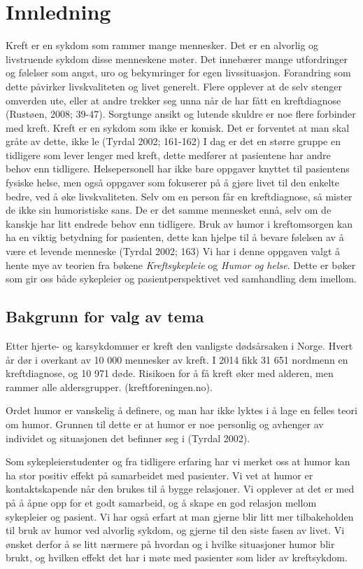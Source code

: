 \chapter{Innledning}

Kreft er en sykdom som rammer mange mennesker. Det er en alvorlig og
livstruende sykdom disse menneskene møter. Det innebærer mange utfordringer og
følelser som angst, uro og bekymringer for egen livssituasjon. Forandring som
dette påvirker livskvaliteten og livet generelt. Flere opplever at de selv
stenger omverden ute, eller at andre trekker seg unna når de har fått en
kreftdiagnose (Rustøen, 2008; 39-47). Sorgtunge ansikt og lutende skuldre er
noe flere forbinder med kreft. Kreft er en sykdom som ikke er komisk. Det er
forventet at man skal gråte av dette, ikke le (Tyrdal 2002; 161-162) I dag er
det en større gruppe en tidligere som lever lenger med kreft, dette medfører at
pasientene har andre behov enn tidligere. Helsepersonell har ikke bare oppgaver
knyttet til pasientens fysiske helse, men også oppgaver som fokuserer på å
gjøre livet til den enkelte bedre, ved å øke livskvaliteten. Selv om en person
får en kreftdiagnose, så mister de ikke sin humoristiske sans. De er det samme
mennesket ennå, selv om de kanskje har litt endrede behov enn tidligere. Bruk
av humor i kreftomsorgen kan ha en viktig betydning for pasienten, dette kan
hjelpe til å bevare følelsen av å være et levende menneske (Tyrdal 2002; 163)
Vi har i denne oppgaven valgt å hente mye av teorien fra bøkene
\textit{Kreftsykepleie} og \textit{Humor og helse}. Dette er bøker som gir oss
både sykepleier og pasientperspektivet ved samhandling dem imellom.

\section{Bakgrunn for valg av tema}

Etter hjerte- og karsykdommer er kreft den vanligste dødsårsaken i Norge. Hvert
år dør i overkant av 10 000 mennesker av kreft. I 2014 fikk 31 651 nordmenn en
kreftdiagnose, og 10 971 døde. Risikoen for å få kreft
øker med alderen, men rammer alle aldersgrupper. (kreftforeningen.no).

Ordet humor er vanskelig å definere, og man har ikke lyktes i å lage en felles
teori om humor. Grunnen til dette er at humor er noe personlig og avhenger av
individet og situasjonen det befinner seg i (Tyrdal 2002).

Som sykepleierstudenter og fra tidligere erfaring har vi merket oss at humor
kan ha stor positiv effekt på samarbeidet med pasienter. Vi vet at humor er
kontaktskapende når den brukes til å bygge relasjoner. Vi opplever at det er
med på å åpne opp for et godt samarbeid, og å skape en god relasjon mellom
sykepleier og pasient. Vi har også erfart at man gjerne blir litt mer
tilbakeholden til bruk av humor ved alvorlig sykdom, og gjerne til den siste
fasen av livet. Vi ønsket derfor å se litt nærmere på hvordan og i hvilke
situasjoner humor blir brukt, og hvilken effekt det har i møte med pasienter
som lider av kreftsykdom.


